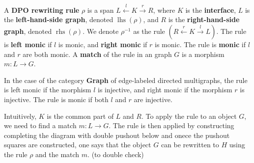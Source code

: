 \begin{definition}
  \label{def:grs:dpo_rule}
A \textbf{DPO rewriting rule} $\rho$ is a span \( L \overset{l}{\leftarrow} K \overset{r}{\rightarrow} R \), where \( K \) is the \textbf{interface}, \( L \) is the \textbf{left-hand-side graph}, denoted \( \operatorname{lhs}(\rho) \), and \( R \) is the \textbf{right-hand-side graph}, denoted \( \operatorname{rhs}(\rho) \). We denote $\rho^{-1}$ as the rule $(R \overset{r}{\leftarrow} K \overset{l}{\rightarrow} L)$. The rule is \textbf{left monic} if \( l \) is monic, and \textbf{right monic} if \( r \) is monic. 
The rule is \textbf{monic} if $l$ and $r$ are both monic.
A \textbf{match} of the rule in an graph \( G \) is a morphism \( m: L \rightarrow G \).
\end{definition}
In the case of the category \textbf{Graph} of edge-labeled directed multigraphs, the rule is left monic if the morphism \( l \) is injective, and right monic if the morphism \( r \) is injective. The rule is monic if both \( l \) and \( r \) are injective.

Intuitively, $K$ is the common part of $L$ and $R$. To apply the rule to an object $G$, we need to find a match $m:L \to G$. The rule is then applied by constructing completing the diagram with double pushout below and onece the pushout squares are constructed, one says that the object $G$ can be rewritten to $H$ using the rule $\rho$ and the match $m$. (to double check)
\begin{center}
\end{center}

